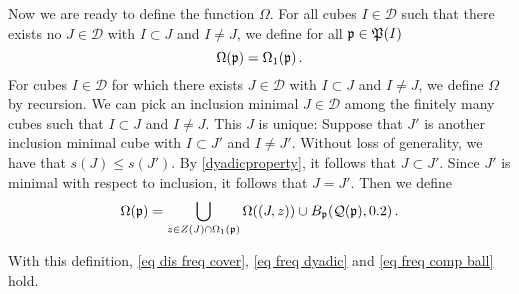 Now we are ready to define the function $\Omega$. For all cubes $I \in \mathcal{D}$ such that there exists no $J \in \mathcal{D}$ with $I \subset J$ and $I \ne J$, we define for all $\mathfrak p \in \mathfrak P(I)$
\begin{equation}
    \label{eq max omega}
    \Omega(\mathfrak p) = \Omega_1(\mathfrak p)\,.
\end{equation}
For cubes $I \in \mathcal{D}$ for which there exists $J \in \mathcal{D}$ with $I \subset J$ and $I \ne J$, we define $\Omega$ by recursion. We can pick an inclusion minimal $J \in \mathcal{D}$ among the finitely many cubes such that $I \subset J$ and $I \ne J$. This $J$ is unique: Suppose that $J'$ is another inclusion minimal cube with $I \subset J'$ and $I \ne J'$. Without loss of generality, we have that $s(J) \le s(J')$. By \eqref{dyadicproperty}, it follows that $J \subset J'$. Since $J'$ is minimal with respect to inclusion, it follows that $J = J'$.  Then we define
\begin{equation}
    \label{eq it omega}
    \Omega(\mathfrak p) = \bigcup_{z \in Z(J) \cap \Omega_1(\mathfrak p)} \Omega((J, z)) \cup B_{\mathfrak p}(\mathcal{Q}(\mathfrak p),0.2)\,.
\end{equation}


\begin{lemma}
    With this definition, \eqref{eq dis freq cover}, \eqref{eq freq dyadic} and \eqref{eq freq comp ball} hold.
\end{lemma}

